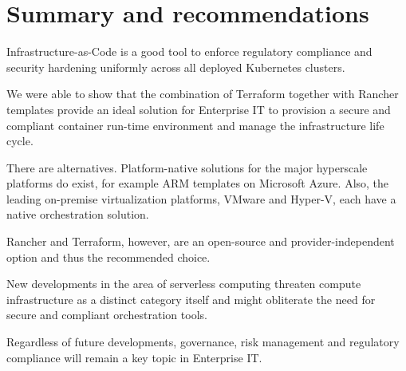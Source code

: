 %
%

\pagebreak
\section{Summary and recommendations}

\onehalfspacing

Infrastructure-as-Code is a good tool to enforce regulatory compliance and security hardening uniformly across all deployed Kubernetes clusters.

We were able to show that the combination of Terraform together with Rancher templates provide an ideal solution for Enterprise IT to provision a secure and compliant container run-time environment and manage the infrastructure life cycle.

There are alternatives. Platform-native solutions for the major hyperscale platforms do exist, for example ARM templates on Microsoft Azure. Also, the leading on-premise virtualization platforms, VMware and Hyper-V, each have a native orchestration solution.

Rancher and Terraform, however, are an open-source and provider-independent
option and thus the recommended choice.

New developments in the area of serverless computing threaten compute infrastructure as a distinct category itself and might obliterate the need for secure and compliant orchestration tools.

Regardless of future developments, governance, risk management and regulatory compliance will remain a key topic in Enterprise IT.
